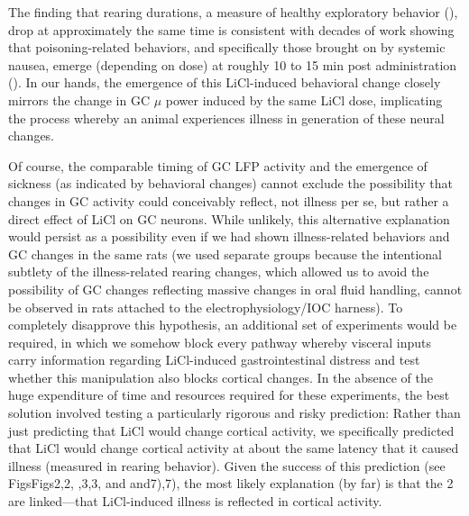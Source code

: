 \begin{refsection}
{The finding that rearing durations, a measure of healthy exploratory behavior (\cite{parker1982a,tomasiewicz2006a,l2019a,aguilar-rivera2020a,alves2005a,rosana2012a}), drop at approximately the same time is consistent with decades of work showing that poisoning-related behaviors, and specifically those brought on by systemic nausea, emerge (depending on dose) at roughly 10 to 15 min post administration (\cite{parker1982a,nachman1963a,nachman1973a,aguilar-rivera2020a}). In our hands, the emergence of this LiCl-induced behavioral change closely mirrors the change in GC \(\mu\) power induced by the same LiCl dose, implicating the process whereby an animal experiences illness in generation of these neural changes.

Of course, the comparable timing of GC LFP activity and the emergence of sickness (as indicated by behavioral changes) cannot exclude the possibility that changes in GC activity could conceivably reflect, not illness per se, but rather a direct effect of LiCl on GC neurons. While unlikely, this alternative explanation would persist as a possibility even if we had shown illness-related behaviors and GC changes in the same rats (we used separate groups because the intentional subtlety of the illness-related rearing changes, which allowed us to avoid the possibility of GC changes reflecting massive changes in oral fluid handling, cannot be observed in rats attached to the electrophysiology/IOC harness). To completely disapprove this hypothesis, an additional set of experiments would be required, in which we somehow block every pathway whereby visceral inputs carry information regarding LiCl-induced gastrointestinal distress and test whether this manipulation also blocks cortical changes. In the absence of the huge expenditure of time and resources required for these experiments, the best solution involved testing a particularly rigorous and risky prediction: Rather than just predicting that LiCl would change cortical activity, we specifically predicted that LiCl would change cortical activity at about the same latency that it caused illness (measured in rearing behavior). Given the success of this prediction (see Figs ​Figs2,2, ​,3,3, and ​and7),7), the most likely explanation (by far) is that the 2 are linked—that LiCl-induced illness is reflected in cortical activity.

}
\end{refsection}
